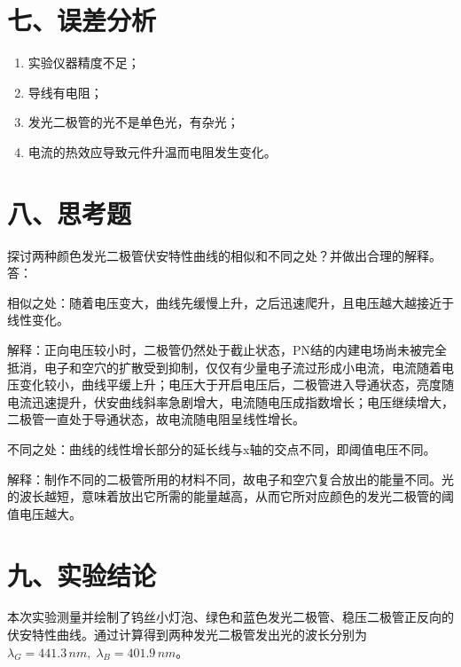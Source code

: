 \documentclass[11pt]{article}
\begin{document}
\section*{七、误差分析}

\begin{enumerate}
    \item 实验仪器精度不足；
    \item 导线有电阻；
    \item 发光二极管的光不是单色光，有杂光；
    \item 电流的热效应导致元件升温而电阻发生变化。
\end{enumerate}

\section*{八、思考题}

探讨两种颜色发光二极管伏安特性曲线的相似和不同之处？并做出合理的解释。
\\答：

相似之处：随着电压变大，曲线先缓慢上升，之后迅速爬升，且电压越大越接近于线性变化。

解释：正向电压较小时，二极管仍然处于截止状态，PN结的内建电场尚未被完全抵消，电子和空穴的扩散受到抑制，仅仅有少量电子流过形成小电流，电流随着电压变化较小，曲线平缓上升；电压大于开启电压后，二极管进入导通状态，亮度随电流迅速提升，伏安曲线斜率急剧增大，电流随电压成指数增长；电压继续增大，二极管一直处于导通状态，故电流随电阻呈线性增长。

不同之处：曲线的线性增长部分的延长线与x轴的交点不同，即阈值电压不同。

解释：制作不同的二极管所用的材料不同，故电子和空穴复合放出的能量不同。光的波长越短，意味着放出它所需的能量越高，从而它所对应颜色的发光二极管的阈值电压越大。

\section*{九、实验结论}

本次实验测量并绘制了钨丝小灯泡、绿色和蓝色发光二极管、稳压二极管正反向的伏安特性曲线。通过计算得到两种发光二极管发出光的波长分别为$\lambda_G=441.3\,nm,\;\lambda_B=401.9\,nm$。
\end{document}
